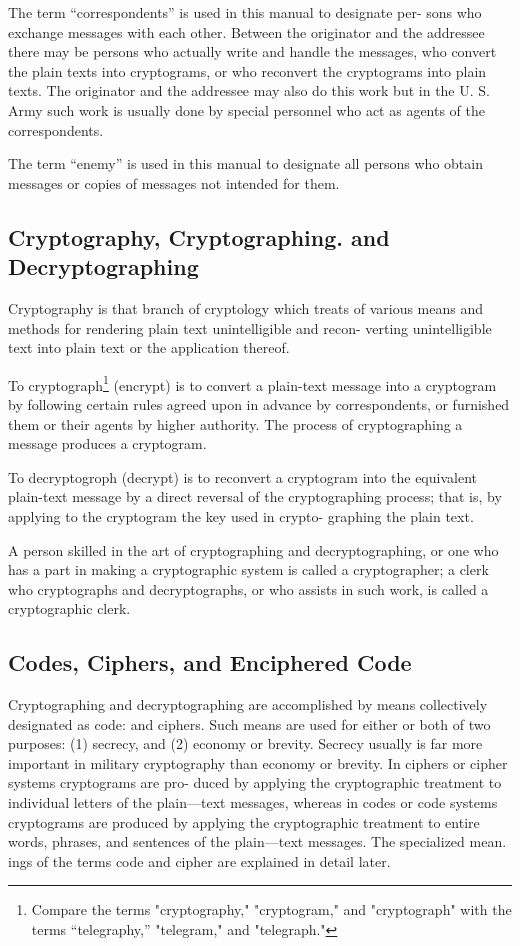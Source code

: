 \mypara The term “correspondents” is used in this manual to designate per-
sons who exchange messages with each other. Between the originator
and the addressee there may be persons who actually write and handle
the messages, who convert the plain texts into cryptograms, or who
reconvert the cryptograms into plain texts. The originator and the
addressee may also do this work but in the U. S. Army such work is
usually done by special personnel who act as agents of the correspondents.

\mypara The term “enemy” is used in this manual to designate all persons
who obtain messages or copies of messages not intended for them.

\subsection{Cryptography, Cryptographing. and Decryptographing}

\mypara Cryptography is that branch of cryptology which treats of various
means and methods for rendering plain text unintelligible and recon-
verting unintelligible text into plain text or the application thereof.

\mypara To cryptograph\footnote{ Compare the terms "cryptography," "cryptogram," and "cryptograph" with the terms “telegraphy,” "telegram," and "telegraph."} (encrypt) is to convert a plain-text message into
a cryptogram by following certain rules agreed upon in advance by
correspondents, or furnished them or their agents by higher authority.
The process of cryptographing a message produces a cryptogram.

\mypara To decryptogroph (decrypt) is to reconvert a cryptogram into the
equivalent plain-text message by a direct reversal of the cryptographing
process; that is, by applying to the cryptogram the key used in crypto-
graphing the plain text.

\mypara A person skilled in the art of cryptographing and decryptographing,
or one who has a part in making a cryptographic system is called a
cryptographer; a clerk who cryptographs and decryptographs, or who
assists in such work, is called a cryptographic clerk.

\subsection{Codes, Ciphers, and Enciphered Code}

\mypara Cryptographing and decryptographing are accomplished by means
collectively designated as code: and ciphers. Such means are used for
either or both of two purposes: (1) secrecy, and (2) economy or brevity.
Secrecy usually is far more important in military cryptography than
economy or brevity. In ciphers or cipher systems cryptograms are pro-
duced by applying the cryptographic treatment to individual letters of
the plain—text messages, whereas in codes or code systems cryptograms
are produced by applying the cryptographic treatment to entire words,
phrases, and sentences of the plain—text messages. The specialized mean.
ings of the terms code and cipher are explained in detail later.

